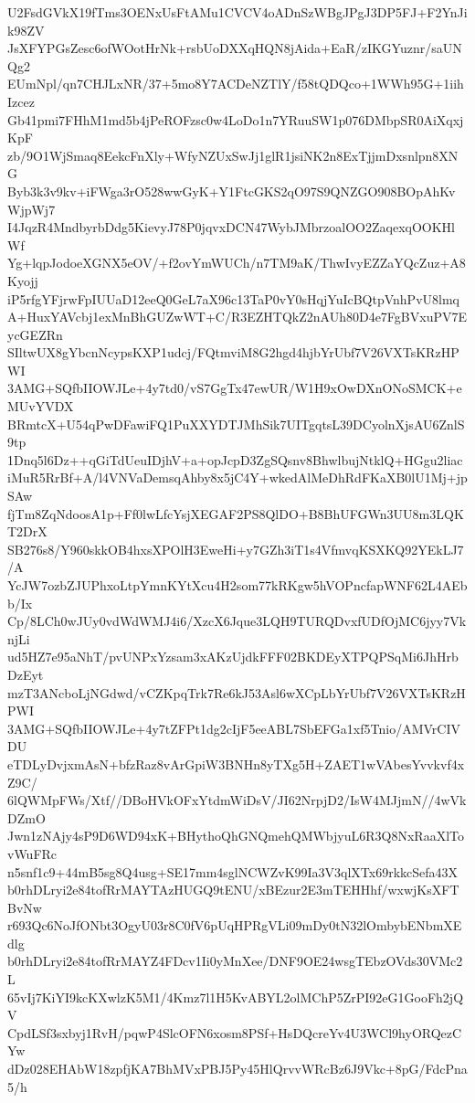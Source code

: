 U2FsdGVkX19fTms3OENxUsFtAMu1CVCV4oADnSzWBgJPgJ3DP5FJ+F2YnJik98ZV
JsXFYPGsZesc6ofWOotHrNk+rsbUoDXXqHQN8jAida+EaR/zIKGYuznr/saUNQg2
EUmNpl/qn7CHJLxNR/37+5mo8Y7ACDeNZTlY/f58tQDQco+1WWh95G+1iihIzcez
Gb41pmi7FHhM1md5b4jPeROFzsc0w4LoDo1n7YRuuSW1p076DMbpSR0AiXqxjKpF
zb/9O1WjSmaq8EekcFnXly+WfyNZUxSwJj1glR1jsiNK2n8ExTjjmDxsnlpn8XNG
Byb3k3v9kv+iFWga3rO528wwGyK+Y1FtcGKS2qO97S9QNZGO908BOpAhKvWjpWj7
I4JqzR4MndbyrbDdg5KievyJ78P0jqvxDCN47WybJMbrzoalOO2ZaqexqOOKHlWf
Yg+lqpJodoeXGNX5eOV/+f2ovYmWUCh/n7TM9aK/ThwIvyEZZaYQcZuz+A8Kyojj
iP5rfgYFjrwFpIUUaD12eeQ0GeL7aX96c13TaP0vY0sHqjYuIcBQtpVnhPvU8lmq
A+HuxYAVcbj1exMnBhGUZwWT+C/R3EZHTQkZ2nAUh80D4e7FgBVxuPV7EycGEZRn
SIltwUX8gYbcnNcypsKXP1udcj/FQtmviM8G2hgd4hjbYrUbf7V26VXTsKRzHPWI
3AMG+SQfbIIOWJLe+4y7td0/vS7GgTx47ewUR/W1H9xOwDXnONoSMCK+eMUvYVDX
BRmtcX+U54qPwDFawiFQ1PuXXYDTJMhSik7UITgqtsL39DCyolnXjsAU6ZnlS9tp
1Dnq5l6Dz++qGiTdUeuIDjhV+a+opJcpD3ZgSQsnv8BhwlbujNtklQ+HGgu2liac
iMuR5RrBf+A/l4VNVaDemsqAhby8x5jC4Y+wkedAlMeDhRdFKaXB0lU1Mj+jpSAw
fjTm8ZqNdoosA1p+Ff0lwLfcYsjXEGAF2PS8QlDO+B8BhUFGWn3UU8m3LQKT2DrX
SB276s8/Y960skkOB4hxsXPOlH3EweHi+y7GZh3iT1s4VfmvqKSXKQ92YEkLJ7/A
YcJW7ozbZJUPhxoLtpYmnKYtXcu4H2som77kRKgw5hVOPncfapWNF62L4AEbb/Ix
Cp/8LCh0wJUy0vdWdWMJ4i6/XzcX6Jque3LQH9TURQDvxfUDfOjMC6jyy7VknjLi
ud5HZ7e95aNhT/pvUNPxYzsam3xAKzUjdkFFF02BKDEyXTPQPSqMi6JhHrbDzEyt
mzT3ANcboLjNGdwd/vCZKpqTrk7Re6kJ53Asl6wXCpLbYrUbf7V26VXTsKRzHPWI
3AMG+SQfbIIOWJLe+4y7tZFPt1dg2cIjF5eeABL7SbEFGa1xf5Tnio/AMVrCIVDU
eTDLyDvjxmAsN+bfzRaz8vArGpiW3BNHn8yTXg5H+ZAET1wVAbesYvvkvf4xZ9C/
6lQWMpFWs/Xtf//DBoHVkOFxYtdmWiDsV/JI62NrpjD2/IsW4MJjmN//4wVkDZmO
Jwn1zNAjy4sP9D6WD94xK+BHythoQhGNQmehQMWbjyuL6R3Q8NxRaaXlTovWuFRc
n5snf1c9+44mB5sg8Q4usg+SE17mm4sglNCWZvK99Ia3V3qlXTx69rkkcSefa43X
b0rhDLryi2e84tofRrMAYTAzHUGQ9tENU/xBEzur2E3mTEHHhf/wxwjKsXFTBvNw
r693Qc6NoJfONbt3OgyU03r8C0fV6pUqHPRgVLi09mDy0tN32lOmbybENbmXEdlg
b0rhDLryi2e84tofRrMAYZ4FDcv1Ii0yMnXee/DNF9OE24wsgTEbzOVds30VMc2L
65vIj7KiYI9kcKXwlzK5M1/4Kmz7l1H5KvABYL2olMChP5ZrPI92eG1GooFh2jQV
CpdLSf3sxbyj1RvH/pqwP4SlcOFN6xosm8PSf+HsDQcreYv4U3WCl9hyORQezCYw
dDz028EHAbW18zpfjKA7BhMVxPBJ5Py45HlQrvvWRcBz6J9Vkc+8pG/FdcPna5/h
